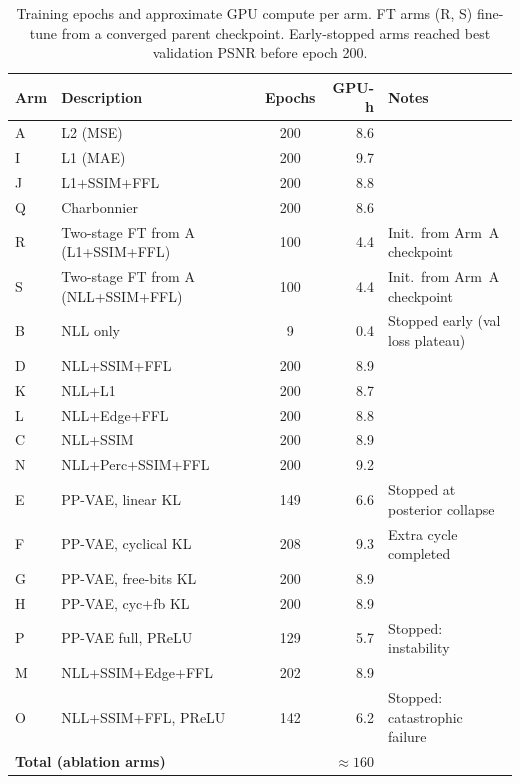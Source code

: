\documentclass[12pt, a4paper, twoside, openright]{book}
\begin{document}
\begin{appendices}
\begin{table}[htbp]
\centering
\caption[Per-arm training epochs and GPU hours]{Training epochs and approximate GPU compute per arm. FT arms (R, S) fine-tune from a converged parent checkpoint. Early-stopped arms reached best validation PSNR before epoch 200.}
\label{tab:app:hyperparams:arms}
\begin{tabular}{llcrl}
\toprule
\textbf{Arm} & \textbf{Description} & \textbf{Epochs} & \textbf{GPU-h} & \textbf{Notes} \\
\midrule
A  & L2 (MSE)              & 200 & 8.6 & \\
I  & L1 (MAE)              & 200 & 9.7 & \\
J  & L1+SSIM+FFL           & 200 & 8.8 & \\
Q  & Charbonnier           & 200 & 8.6 & \\
R  & Two-stage FT from A (L1+SSIM+FFL) & 100 & 4.4 & Init.\ from Arm~A checkpoint \\
S  & Two-stage FT from A (NLL+SSIM+FFL) & 100 & 4.4 & Init.\ from Arm~A checkpoint \\
B  & NLL only              & 9   & 0.4 & Stopped early (val loss plateau) \\
D  & NLL+SSIM+FFL          & 200 & 8.9 & \\
K  & NLL+L1                & 200 & 8.7 & \\
L  & NLL+Edge+FFL          & 200 & 8.8 & \\
C  & NLL+SSIM              & 200 & 8.9 & \\
N  & NLL+Perc+SSIM+FFL     & 200 & 9.2 & \\
E  & PP-VAE, linear KL     & 149 & 6.6 & Stopped at posterior collapse \\
F  & PP-VAE, cyclical KL   & 208 & 9.3 & Extra cycle completed \\
G  & PP-VAE, free-bits KL  & 200 & 8.9 & \\
H  & PP-VAE, cyc+fb KL     & 200 & 8.9 & \\
P  & PP-VAE full, PReLU    & 129 & 5.7 & Stopped: instability \\
M  & NLL+SSIM+Edge+FFL     & 202 & 8.9 & \\
O  & NLL+SSIM+FFL, PReLU   & 142 & 6.2 & Stopped: catastrophic failure \\
\midrule
\multicolumn{3}{l}{\textbf{Total (ablation arms)}} & $\approx 160$ & \\
\bottomrule
\end{tabular}
\end{table}


\end{appendices}
\end{document}
